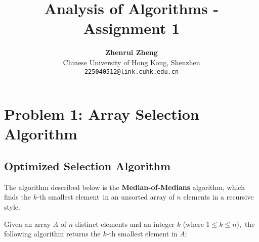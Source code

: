 \documentclass[11pt, a4paper, oneside]{memoir}
\title{\huge\textbf{Analysis of Algorithms - Assignment 1}\vspace{-0.5cm}}
\author{\textbf{Zhenrui Zheng} \vspace{0.5cm} \\ \small Chinese University of Hong Kong, Shenzhen \\ \small\texttt{225040512@link.cuhk.edu.cn}}
\date{}
\begin{document}
\begin{titlingpage}
    \maketitle
    \renewcommand{\contentsname}{\huge Contents \vspace{-1cm}}
    \begin{KeepFromToc} %
        \tableofcontents
    \end{KeepFromToc}
\end{titlingpage}

\chapter{Problem 1: Array Selection Algorithm}

\section{Optimized Selection Algorithm}
The algorithm described below is the \textbf{Median-of-Medians} algorithm, which finds the $k$-th smallest element\
in an unsorted array of $n$ elements in a recursive style.

Given an array $A$ of $n$ distinct elements and an integer $k$ (where $1 \le k \le n$),\
the following algorithm returns the $k$-th smallest element in $A$:
\end{document}
